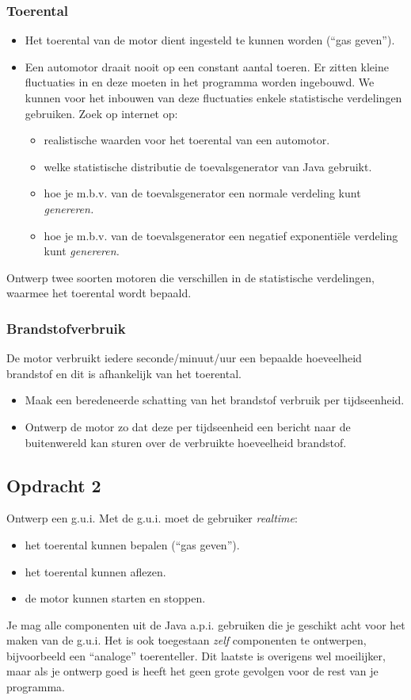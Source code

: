 \documentclass[fleqn,11pt]{article}
\begin{document}
\subsubsection*{Toerental}
\begin{itemize}
\item Het toerental van de motor dient ingesteld te kunnen worden (``gas geven'').
\item Een automotor draait nooit op een constant aantal toeren. Er zitten kleine fluctuaties in en deze moeten in het programma worden ingebouwd. We kunnen voor het inbouwen van deze fluctuaties enkele statistische verdelingen gebruiken. Zoek op internet op:
\begin{itemize}
\item realistische waarden voor het toerental van een automotor.
\item welke statistische distributie de toevalsgenerator van Java gebruikt.
\item hoe je m.b.v. van de toevalsgenerator een normale verdeling kunt \emph{genereren.}
\item hoe je m.b.v. van de toevalsgenerator een negatief exponenti\"ele verdeling kunt \emph{genereren.}
\end{itemize}
\end{itemize}
Ontwerp twee soorten motoren die verschillen in de statistische verdelingen, waarmee het toerental wordt bepaald. 



\subsubsection*{Brandstofverbruik}
De motor verbruikt iedere seconde/minuut/uur een bepaalde hoeveelheid brandstof en dit is afhankelijk van het toerental. 
\begin{itemize}
\item Maak een beredeneerde schatting van het brandstof verbruik per tijdseenheid.
\item Ontwerp de motor zo dat deze per tijdseenheid een bericht naar de buitenwereld kan sturen over de verbruikte hoeveelheid brandstof. 
\end{itemize}

\subsection*{Opdracht 2}
Ontwerp een g.u.i. Met de g.u.i. moet de gebruiker \emph{realtime}:
\begin{itemize}
\item het toerental kunnen bepalen (``gas geven'').
\item het toerental kunnen aflezen.
\item de motor kunnen starten en stoppen. 
\end{itemize}
Je mag alle componenten uit de Java a.p.i. gebruiken die je geschikt acht voor het maken van de g.u.i. Het is ook toegestaan \emph{zelf} componenten te ontwerpen, bijvoorbeeld een ``analoge'' toerenteller. Dit laatste is overigens wel moeilijker, maar als je ontwerp goed is heeft het geen grote gevolgen voor de rest van je programma. 
\end{document}
